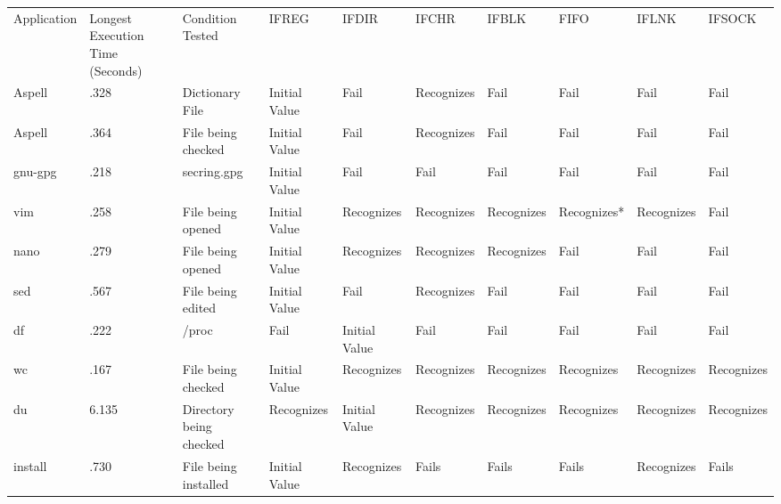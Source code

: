     \begin{table*}[t]
        \scriptsize{}
        \begin{tabular}{l  l  l  l  l  l  l  l  l}
        \toprule{}
          Application & Longest Execution Time (Seconds) & Condition Tested           & IFREG        & IFDIR        & IFCHR     & IFBLK    & FIFO      & IFLNK    & IFSOCK\\
          Aspell      & .328                             & Dictionary File            & Initial Value  & Fail           & Recognizes  & Fail       & Fail        & Fail       & Fail\\
          Aspell      & .364                             & File being checked         & Initial Value  & Fail           & Recognizes  & Fail       & Fail        & Fail       & Fail\\
          gnu-gpg     & .218                             & secring.gpg                & Initial Value  & Fail           & Fail        & Fail       & Fail        & Fail       & Fail\\
          vim         & .258                             & File being opened          & Initial Value  & Recognizes     & Recognizes  & Recognizes & Recognizes* & Recognizes & Fail\\
          nano        & .279                             & File being opened          & Initial Value  & Recognizes     & Recognizes  & Recognizes & Fail        & Fail       & Fail\\
          sed         & .567                             & File being edited          & Initial Value  & Fail           & Recognizes  & Fail       & Fail        & Fail       & Fail\\
          df          & .222                             & /proc                      & Fail           & Initial Value  & Fail        & Fail       & Fail        & Fail       & Fail\\
          wc          & .167                             & File being checked         & Initial Value  & Recognizes     & Recognizes  & Recognizes & Recognizes  & Recognizes & Recognizes\\
          du          & 6.135                            & Directory being checked    & Recognizes     & Initial Value  & Recognizes  & Recognizes & Recognizes  & Recognizes & Recognizes\\
          install     & .730                             & File being installed       & Initial Value  & Recognizes     & Fails       & Fails      & Fails       & Recognizes & Fails\\

\end{tabular}
\end{table*}
